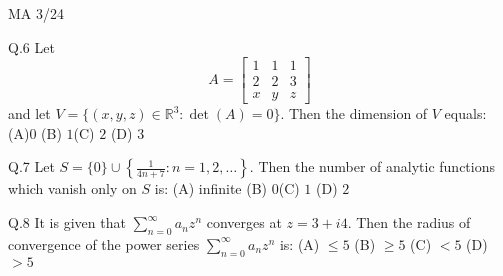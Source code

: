 \documentclass{article}
\begin{document}
																								    \vspace{1em}

																								    \begin{center}
																								        {MA 3/24}
																									\end{center}
																									\newpage

																									Q.6 \quad Let 
																									\[
																									A = \begin{bmatrix}
																									1 & 1 & 1 \\
																									2 & 2 & 3 \\
																									x & y & z
																									\end{bmatrix}
																									\]
																									and let $V = \{(x, y, z) \in \mathbb{R}^3 : \det(A) = 0\}$. Then the dimension of $V$ equals:
																									\vspace{1em}
																									\newline \noindent (A)$0$ \hspace{2cm} (B) $1$\hspace{2cm}(C) $2$ \hspace{2cm} (D) $3$

																									\vspace{1em}
																									Q.7 \quad Let $S = \{0\} \cup \left\{ \frac{1}{4n + 7} : n = 1, 2, \ldots \right\}$. Then the number of analytic functions which vanish only on $S$ is:
																									\vspace{1em}
																									\newline \noindent (A) infinite \hspace{2cm} (B) $0$\hspace{2cm}(C) $1$ \hspace{2cm} (D) $2$

																									\vspace{1em}
																									{Q.8} \quad It is given that $\sum_{n=0}^\infty a_n z^n$ converges at $z = 3 + i4$. Then the radius of convergence of the power series $\sum_{n=0}^\infty a_n z^n$ is:
																									\vspace{1em}
																									\newline \noindent (A) $\leq 5$ \hspace{2cm} (B) $\geq 5$ \hspace{2cm} (C) $< 5$ \hspace{2cm} (D) $> 5$
																									\vspace{1em}
\end{document}
